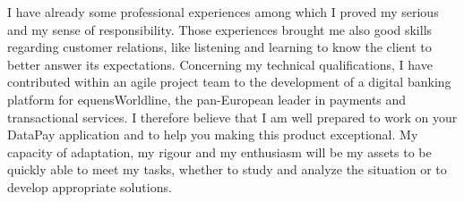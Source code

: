 \documentclass[11pt, a4paper]{awesome-cv}
\begin{document}
\begin{cvletter}
\vspace{2mm} 

I have already some professional experiences among which I proved my serious and my sense of responsibility. Those experiences brought me also good skills regarding customer relations, like listening and learning to know the client to better answer its expectations. Concerning my technical qualifications, I have contributed within an agile project team to the development of a digital banking platform for equensWorldline, the pan-European leader in payments and transactional services. I therefore believe that I am well prepared to work on your DataPay application and to help you making this product exceptional. \newline
My capacity of adaptation, my rigour and my enthusiasm will be my assets to be quickly able to meet my tasks, whether to study and analyze the situation or to develop appropriate solutions. 




\end{cvletter}


\makeletterclosing
\end{document}
